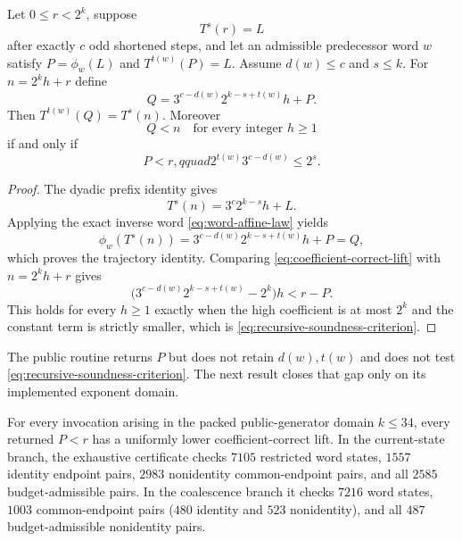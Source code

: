 \begin{theorem}
\label{thm:recursive-lift-criterion}
Let $0\le r<2^k$, suppose
\[
 T^s(r)=L
\]
after exactly $c$ odd shortened steps, and let an admissible predecessor word
$w$ satisfy $P=\phi_w(L)$ and $T^{t(w)}(P)=L$.  Assume $d(w)\le c$ and
$s\le k$.  For $n=2^kh+r$ define
\begin{equation}
 Q=3^{c-d(w)}2^{k-s+t(w)}h+P.
 \label{eq:coefficient-correct-lift}
\end{equation}
Then $T^{t(w)}(Q)=T^s(n)$.  Moreover
\[
 Q<n\quad\text{for every integer }h\ge1
\]
if and only if
\begin{equation}
 P<r,qquad 2^{t(w)}3^{c-d(w)}\le2^s.
 \label{eq:recursive-soundness-criterion}
\end{equation}
\end{theorem}

\begin{proof}
The dyadic prefix identity gives
\[
 T^s(n)=3^c2^{k-s}h+L.
\]
Applying the exact inverse word \eqref{eq:word-affine-law} yields
\[
 \phi_w(T^s(n))
 =3^{c-d(w)}2^{k-s+t(w)}h+P=Q,
\]
which proves the trajectory identity.  Comparing \eqref{eq:coefficient-correct-lift}
with $n=2^kh+r$ gives
\[
 \bigl(3^{c-d(w)}2^{k-s+t(w)}-2^k\bigr)h<r-P.
\]
This holds for every $h\ge1$ exactly when the high coefficient is at most
$2^k$ and the constant term is strictly smaller, which is
\eqref{eq:recursive-soundness-criterion}.
\end{proof}

The public routine returns $P$ but does not retain $d(w),t(w)$ and does not
test \eqref{eq:recursive-soundness-criterion}.  The next result closes that
gap only on its implemented exponent domain.

\begin{certificate}
\label{cert:finite-k34}
For every invocation arising in the packed public-generator domain $k\le34$,
every returned $P<r$ has a uniformly lower coefficient-correct lift.  In the
current-state branch, the exhaustive certificate checks $7105$ restricted
word states, $1557$ identity endpoint pairs, $2983$ nonidentity
common-endpoint pairs, and all $2585$ budget-admissible pairs.  In the
coalescence branch it checks $7216$ word states, $1003$ common-endpoint pairs
($480$ identity and $523$ nonidentity), and all $487$ budget-admissible
nonidentity pairs.
\end{certificate}


